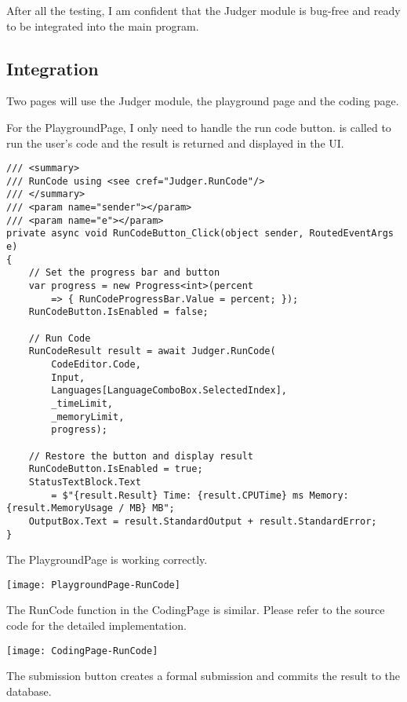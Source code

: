 \documentclass[report.tex]{subfiles}
\begin{document}
After all the testing, I am confident that the Judger module is bug-free and ready to be integrated into the main program.

\subsection{Integration}

Two pages will use the Judger module, the playground page and the coding page.

For the PlaygroundPage, I only need to handle the run code button.  is called to run the user's code and the result is returned and displayed in the UI.

\begin{verbatim}
/// <summary>
/// RunCode using <see cref="Judger.RunCode"/>
/// </summary>
/// <param name="sender"></param>
/// <param name="e"></param>
private async void RunCodeButton_Click(object sender, RoutedEventArgs e)
{
    // Set the progress bar and button
    var progress = new Progress<int>(percent 
        => { RunCodeProgressBar.Value = percent; });
    RunCodeButton.IsEnabled = false;

    // Run Code
    RunCodeResult result = await Judger.RunCode(
        CodeEditor.Code,
        Input,
        Languages[LanguageComboBox.SelectedIndex],
        _timeLimit,
        _memoryLimit,
        progress);

    // Restore the button and display result
    RunCodeButton.IsEnabled = true;
    StatusTextBlock.Text 
        = $"{result.Result} Time: {result.CPUTime} ms Memory: {result.MemoryUsage / MB} MB";
    OutputBox.Text = result.StandardOutput + result.StandardError;
}
\end{verbatim}

The PlaygroundPage is working correctly.

\texttt{[image: PlaygroundPage-RunCode]}

The RunCode function in the CodingPage is similar. Please refer to the source code for the detailed implementation.

\texttt{[image: CodingPage-RunCode]}

The submission button creates a formal submission and commits the result to the database.
\end{document}
